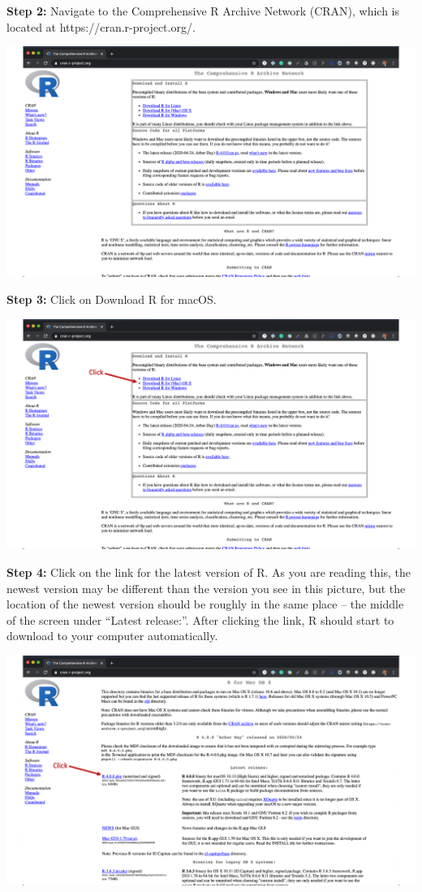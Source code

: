 \documentclass[
  letterpaper,
  DIV=11,
  numbers=noendperiod]{scrreprt}
\begin{document}
\textbf{Step 2:} Navigate to the Comprehensive R Archive Network (CRAN),
which is located at https://cran.r-project.org/.

\includegraphics{chapters/installing_r_and_rstudio/mac_cran.png}

\textbf{Step 3:} Click on Download R for macOS.

\includegraphics{chapters/installing_r_and_rstudio/mac_download_r.png}

\textbf{Step 4:} Click on the link for the latest version of R. As you
are reading this, the newest version may be different than the version
you see in this picture, but the location of the newest version should
be roughly in the same place -- the middle of the screen under ``Latest
release:''. After clicking the link, R should start to download to your
computer automatically.

\includegraphics{chapters/installing_r_and_rstudio/mac_r_version.png}
\end{document}
